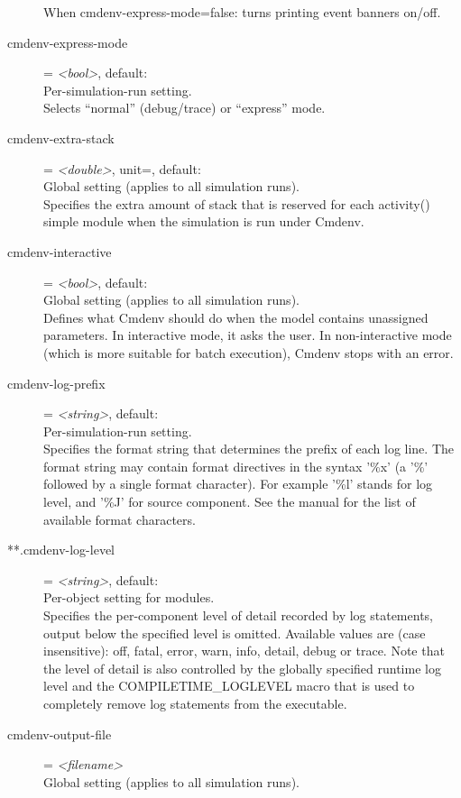 \begin{description}
    When cmdenv-express-mode=false: turns printing event banners on/off.
\item[cmdenv-express-mode] = \textit{<bool>}, default: \\
    Per-simulation-run setting.\\
    Selects ``normal'' (debug/trace) or ``express'' mode.
\item[cmdenv-extra-stack] = \textit{<double>}, unit=, default: \\
    Global setting (applies to all simulation runs).\\
    Specifies the extra amount of stack that is reserved for each activity()
    simple module when the simulation is run under Cmdenv.
\item[cmdenv-interactive] = \textit{<bool>}, default: \\
    Global setting (applies to all simulation runs).\\
    Defines what Cmdenv should do when the model contains unassigned
    parameters. In interactive mode, it asks the user. In non-interactive mode
    (which is more suitable for batch execution), Cmdenv stops with an error.
\item[cmdenv-log-prefix] = \textit{<string>}, default: \ttt{[\%l]	}\\
    Per-simulation-run setting.\\
    Specifies the format string that determines the prefix of each log line.
    The format string may contain format directives in the syntax '\%x' (a '\%'
    followed by a single format character).  For example '\%l' stands for log
    level, and '\%J' for source component. See the manual for the list of
    available format characters.
\item[**.cmdenv-log-level] = \textit{<string>}, default: \\
    Per-object setting for modules.\\
    Specifies the per-component level of detail recorded by log statements,
    output below the specified level is omitted. Available values are (case
    insensitive): off, fatal, error, warn, info, detail, debug or trace. Note
    that the level of detail is also controlled by the globally specified
    runtime log level and the COMPILETIME\_LOGLEVEL macro that is used to
    completely remove log statements from the executable.
\item[cmdenv-output-file] = \textit{<filename>}\\
    Global setting (applies to all simulation runs).\\

\end{description}
